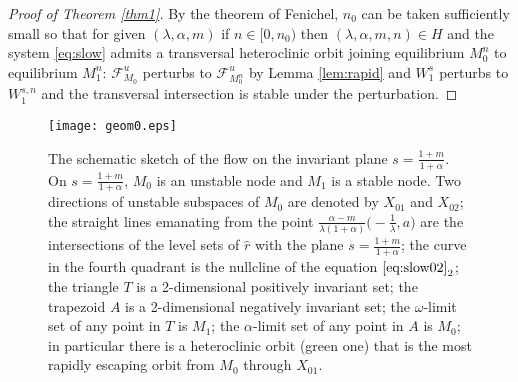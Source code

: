 \documentclass[a4paper,11pt]{article}
\theoremstyle{remark}
\begin{document}
\begin{proof}[Proof of Theorem \ref{thm1}] 
 By the theorem of Fenichel, $n_0$ can be taken sufficiently small so that for given $(\lambda,\alpha,m)$ if $n \in [0, n_0)$ then $(\lambda,\alpha,m,n) \in H$ and  the system  \eqref{eq:slow} admits a transversal heteroclinic orbit joining equilibrium $M_0^{n}$ to equilibrium $M_1^{n}$: $\mathcal{F}^u_{M_0}$ perturbs to $\mathcal{F}^u_{M_0^n}$ by Lemma \ref{lem:rapid} and $W_1^s$ perturbs to $W_1^{s,n}$ and the transversal intersection is stable under the perturbation. 
\end{proof}
\begin{figure}
 \centering
  \texttt{[image: geom0.eps]} \label{fig:flow0}
  \caption{The schematic sketch of the flow on the invariant plane $s=\frac{1+m}{1+\alpha}$.   On $s=\frac{1+m}{1+\alpha}$, $M_0$ is an unstable node and $M_1$ is a stable node. Two directions of unstable subspaces of $M_0$ are denoted by $X_{01}$ and $X_{02}$; the straight lines emanating from the 
  point $\frac{\alpha-m}{\lambda(1+\alpha)}\big(-\frac{1}{\lambda},a\big)$ are the intersections of the level sets of $\hat{r}$ 
  with the plane $s=\frac{1+m}{1+\alpha}$; the curve in the fourth quadrant is the nullcline of the equation $\eqref{eq:slow02}_2$; the triangle $T$ is a 2-dimensional positively invariant set; the trapezoid $A$ is a 2-dimensional negatively invariant set; the $\omega$-limit set of any point in $T$ is $M_1$; 
  the $\alpha$-limit set of any point in $A$ is $M_0$; in particular there is a heteroclinic orbit (green one) that is the most rapidly escaping orbit from $M_0$ through $X_{01}$.  } 
\end{figure}
\end{document}
